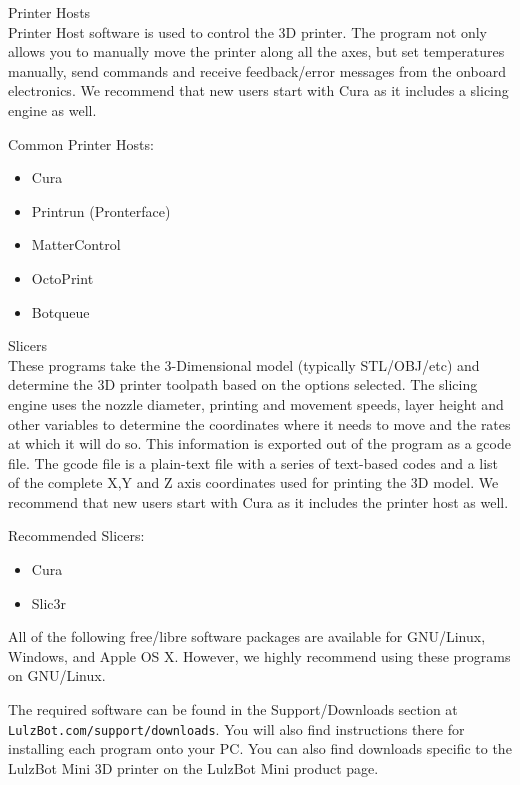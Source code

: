 \begin{description}
\item{Printer Hosts} \hfill \\
Printer Host software is used to control the 3D printer. The program not only allows you to manually move the printer along all the axes, but set temperatures manually, send commands and receive feedback/error messages from the onboard electronics. We recommend that new users start with Cura as it includes a slicing engine as well.

Common Printer Hosts:
\begin{itemize}
\item Cura
\item Printrun (Pronterface)
\item MatterControl
\item OctoPrint
\item Botqueue
\end{itemize}

\item{Slicers} \hfill \\
These programs take the 3-Dimensional model (typically STL/OBJ/etc) and determine the 3D printer toolpath based on the options selected. The slicing engine uses the nozzle diameter, printing and movement speeds, layer height and other variables to determine the coordinates where it needs to move and the rates at which it will do so. This information is exported out of the program as a gcode file. The gcode file is a plain-text file with a series of text-based codes and a list of the complete X,Y and Z axis coordinates used for printing the 3D model. We recommend that new users start with Cura as it includes the printer host as well.

Recommended Slicers:
\begin{itemize}
\item Cura
\item Slic3r
\end{itemize}

\end{description}

All of the following free/libre software packages are available for GNU/Linux, Windows, and Apple OS X. However, we highly recommend using these programs on GNU/Linux.

The required software can be found in the Support/Downloads section at \texttt{LulzBot.com/support/downloads}. You will also find instructions there for installing each program onto your PC. You can also find downloads specific to the LulzBot\textsuperscript{\miniscule{\texttrademark}} Mini 3D printer on the LulzBot\textsuperscript{\miniscule{\texttrademark}} Mini product page.


